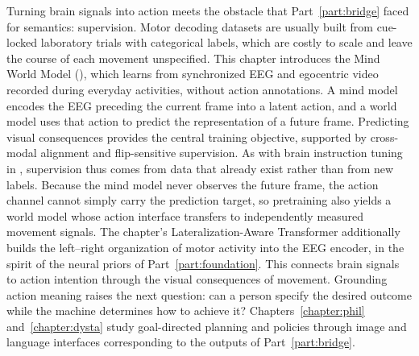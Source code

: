 Turning brain signals into action meets the obstacle that Part~\ref{part:bridge} faced for semantics: supervision. Motor decoding datasets are usually built from cue-locked laboratory trials with categorical labels, which are costly to scale and leave the course of each movement unspecified. This chapter introduces the Mind World Model (\mwm{}), which learns from synchronized EEG and egocentric video recorded during everyday activities, without action annotations. A mind model encodes the EEG preceding the current frame into a latent action, and a world model uses that action to predict the representation of a future frame. Predicting visual consequences provides the central training objective, supported by cross-modal alignment and flip-sensitive supervision. As with brain instruction tuning in \mindllm{}, supervision thus comes from data that already exist rather than from new labels. Because the mind model never observes the future frame, the action channel cannot simply carry the prediction target, so pretraining also yields a world model whose action interface transfers to independently measured movement signals. The chapter's Lateralization-Aware Transformer additionally builds the left--right organization of motor activity into the EEG encoder, in the spirit of the neural priors of Part~\ref{part:foundation}. This connects brain signals to action intention through the visual consequences of movement. Grounding action meaning raises the next question: can a person specify the desired outcome while the machine determines how to achieve it? Chapters~\ref{chapter:phil} and~\ref{chapter:dysta} study goal-directed planning and policies through image and language interfaces corresponding to the outputs of Part~\ref{part:bridge}.




